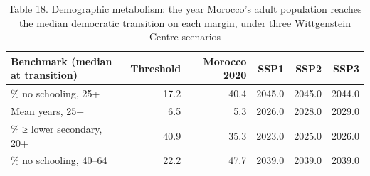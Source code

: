 \begin{table}
\caption{Table 18. Demographic metabolism: the year Morocco's adult population reaches the median democratic transition on each margin, under three Wittgenstein Centre scenarios}
\label{tab:T18_demographic_metabolism}
\begin{tabular}{lrrrrr}
\toprule
Benchmark (median at transition) & Threshold & Morocco 2020 & SSP1 & SSP2 & SSP3 \\
\midrule
\% no schooling, 25+ & 17.2 & 40.4 & 2045.0 & 2045.0 & 2044.0 \\
Mean years, 25+ & 6.5 & 5.3 & 2026.0 & 2028.0 & 2029.0 \\
\% ≥ lower secondary, 20+ & 40.9 & 35.3 & 2023.0 & 2025.0 & 2026.0 \\
\% no schooling, 40–64 & 22.2 & 47.7 & 2039.0 & 2039.0 & 2039.0 \\
\bottomrule
\end{tabular}
\end{table}

